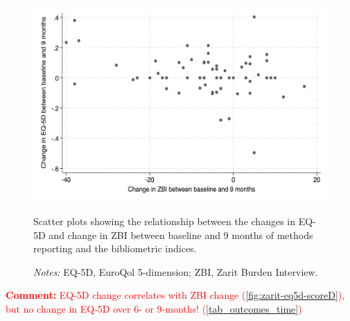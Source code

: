 \documentclass[12pt]{article}
\begin{document}
\begin{figure}[H]
    \centering
    \includegraphics[width=1\linewidth]{output/figures/zarit-eq5d-scoreD.png}
    \caption{Scatter plots showing the relationship between the changes in EQ-5D and change in ZBI between baseline and 9 months of methods reporting and the bibliometric indices. }
    \label{fig:zarit-eq5d-scoreD}
    \caption*{\footnotesize \textit{Notes:} EQ-5D, EuroQol 5-dimension; ZBI, Zarit Burden Interview.}
\end{figure}

\textcolor{red}{\textbf{Comment:} EQ-5D change correlates with ZBI change (\autoref{fig:zarit-eq5d-scoreD}), but no change in EQ-5D over 6- or 9-months! (\autoref{tab_outcomes_time})}


\clearpage
\newrefcontext[sorting=nyt]
\printbibliography
\end{document}
